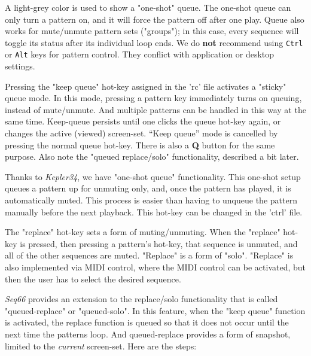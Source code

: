    A light-grey color is used to show a "one-shot" queue.
   The one-shot queue can only turn a pattern on, and it
   will force the pattern off after one play.
   Queue also works for mute/unmute pattern sets ("groups"); in this case,
   every sequence will toggle its status after its individual loop ends. 
   We do \textbf{not}
   recommend using \texttt{Ctrl} or \texttt{Alt}
   keys for pattern control.  They conflict with application or desktop
   settings.

   Pressing the "keep queue" hot-key
   assigned in the 'rc' file activates a "sticky" queue mode.
   In this mode, pressing a pattern key immediately turns on queuing, instead
   of mute/unmute.  And multiple patterns can be handled in this way at the
   same time.
   Keep-queue persists until one clicks the queue hot-key again,
   or changes the active (viewed) screen-set. 
   “Keep queue” mode is cancelled by pressing the normal queue hot-key.
   There is also a \textbf{Q} button for the same purpose.
   Also note the "queued replace/solo" functionality, described a bit later.

   Thanks to \textsl{Kepler34}, we have "one-shot queue"
   functionality.  This one-shot setup queues a pattern up for unmuting only,
   and, once the pattern has played, it is automatically muted.  This process
   is easier than having to unqueue the pattern manually before the next
   playback.
   This hot-key can be changed in the 'ctrl' file.

   The "replace" hot-key sets a form of muting/unmuting.
   When the "replace" hot-key is
   pressed, then pressing a pattern's hot-key,
   that sequence is unmuted, and all of the other sequences are muted.
   "Replace" is a form of "solo".
   "Replace" is also implemented via MIDI control,
   where the MIDI control can be activated, but then the user has to select
   the desired sequence.  

   \textsl{Seq66} provides an extension to the replace/solo functionality
   that is called "queued-replace" or "queued-solo".  In this feature, when
   the "keep queue" function is activated, the replace function is queued so
   that it does not occur until the next time the patterns loop.
   And queued-replace provides a form of snapshot, limited to the
   \textsl{current} screen-set.
   Here are the steps:

